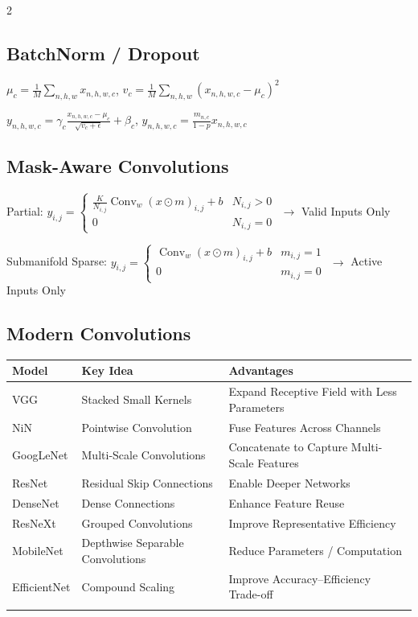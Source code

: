 \documentclass[a4paper]{article}
\newlength{\activationwidth}
\let\originalsum\sum
\renewcommand{\sum}{\mathop{\textstyle\originalsum}\nolimits}
\begin{document}
\begin{multicols}{2}
\subsection*{BatchNorm / Dropout}
\noindent \(\displaystyle \mu_c=\frac1M\sum_{n,h,w}x_{n,h,w,c}\), \(\displaystyle v_c=\frac1M\sum_{n,h,w}(x_{n,h,w,c}-\mu_c)^2\)\par
\noindent \(\displaystyle y_{n,h,w,c}=\gamma_c\frac{x_{n,h,w,c}-\mu_c}{\sqrt{v_c+\epsilon}}+\beta_c\), \(\displaystyle y_{n,h,w,c}=\frac{m_{n,c}}{1-p}x_{n,h,w,c}\)\par
\subsection*{Mask-Aware Convolutions}
\noindent Partial: \(\displaystyle y_{i,j}=\begin{cases}\frac{K}{N_{i,j}}\operatorname{Conv}_{w}(x\odot m)_{i,j}+b & N_{i,j}>0\\ 0 & N_{i,j}=0\end{cases}\) \(\to\) Valid Inputs Only\par
\noindent Submanifold Sparse: \(\displaystyle y_{i,j}=\begin{cases}\operatorname{Conv}_{w}(x\odot m)_{i,j}+b & m_{i,j}=1\\ 0 & m_{i,j}=0\end{cases}\) \(\to\) Active Inputs Only\par
\subsection*{Modern Convolutions}
\par\begingroup\fontsize{7}{8.5}\selectfont\setlength{\tabcolsep}{1.7pt}\renewcommand{\arraystretch}{1.3}\setlength{\activationwidth}{\dimexpr\linewidth-4\tabcolsep\relax}\noindent\begin{tabular}{@{}>{\raggedright\arraybackslash}m{.17\activationwidth}>{\raggedright\arraybackslash}m{.36\activationwidth}>{\raggedright\arraybackslash}m{.47\activationwidth}@{}}\toprule\textbf{Model} & \textbf{Key Idea} & \textbf{Advantages}\\\midrule
VGG & Stacked Small Kernels & Expand Receptive Field with Less Parameters\\\addlinespace[1pt]
NiN & Pointwise Convolution & Fuse Features Across Channels\\\addlinespace[1pt]
GoogLeNet & Multi-Scale Convolutions & Concatenate to Capture Multi-Scale Features\\\addlinespace[1pt]
ResNet & Residual Skip Connections & Enable Deeper Networks\\\addlinespace[1pt]
DenseNet & Dense Connections & Enhance Feature Reuse\\\addlinespace[1pt]
ResNeXt & Grouped Convolutions & Improve Representative Efficiency\\\addlinespace[1pt]
MobileNet & Depthwise Separable Convolutions & Reduce Parameters / Computation\\\addlinespace[1pt]
EfficientNet & Compound Scaling & Improve Accuracy--Efficiency Trade-off\\\addlinespace[1pt]
\bottomrule\end{tabular}\par\endgroup

\end{multicols}
\end{document}

